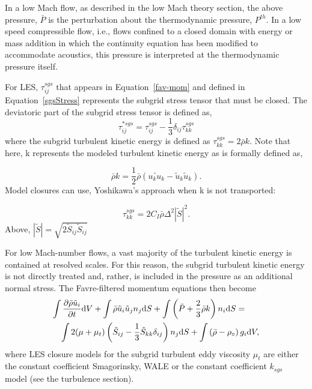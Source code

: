 In a low Mach flow, as described in the low Mach theory section, 
the above pressure, $\bar P$ is the perturbation about the thermodynamic
pressure, $P^{th}$. In a low speed compressible flow, i.e., flows confined to a closed
domain with energy or mass addition in which the continuity equation
has been modified to accommodate acoustics, this pressure is interpreted at the
thermodynamic pressure itself.

For LES, $\tau^{sgs}_{ij}$ that appears in Equation~\ref{fav-mom} and defined in 
Equation~\ref{sgsStress} represents the subgrid stress tensor that must be closed.  The deviatoric part of the subgrid stress tensor is defined as,
%
\begin{equation}
\tau^{*sgs}_{ij} = \tau^{sgs}_{ij} - \frac{1}{3} \delta_{ij} \tau^{sgs}_{kk}
\end{equation}
%
where the subgrid turbulent kinetic energy is defined as $\tau^{sgs}_{kk} = 2 \bar \rho k$.
Note that here, k represents the modeled turbulent kinetic energy as is formally defined as,

\begin{equation}
\bar \rho k = \frac{1}{2} \bar\rho ( \widetilde{u_k u_k} - \tilde u_k \tilde u_k).
\end{equation}
%
Model closures can use, Yoshikawa's approach when k is not transported:

\begin{equation}
\tau^{sgs}_{kk} = 2 C_I \bar \rho \Delta^2 | \tilde S | ^2.
\end{equation}
%
Above, $ | \tilde S | = \sqrt {2 \tilde S_{ij} \tilde S_{ij}}$

For low Mach-number flows, a vast majority of the turbulent kinetic energy
is contained at resolved scales. For this reason, the subgrid turbulent kinetic energy is not 
directly treated and, rather, is included in the pressure as an
additional normal stress.  The Favre-filtered momentum equations then become
%
\begin{eqnarray}
\lefteqn{ \int {{\partial \bar{\rho} \tilde{u}_i} \over {\partial t}}
     {\rm d}V + \int \bar{\rho} \tilde{u}_i \tilde{u}_j n_j {\rm d}S 
   + \int \left( \bar{P} + \frac{2}{3} \bar{\rho} k \right) 
     n_i {\rm d}S = } \nonumber \\
   && \int 2 (\mu + \mu_t) \left( \tilde{S}_{ij} - \frac{1}{3}
      \tilde{S}_{kk} \delta_{ij} \right) n_j {\rm d}S
    + \int \left(\bar{\rho} - \rho_{\circ} \right) g_i {\rm d}V,
\label{mod-mom-les}
\end{eqnarray}
%
where LES closure models for the subgrid turbulent eddy viscosity
$\mu_t$ are either the constant coefficient Smagorinsky, WALE or the constant 
coefficient $k_{sgs}$ model (see the turbulence section).

